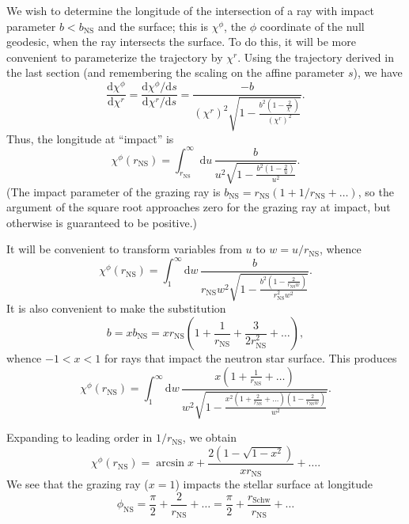 \documentclass[modern]{aastex631}
\newcommand{\dd}{\mathrm{d}}
\newcommand{\bNS}{b_\mathrm{NS}}
\newcommand{\phiNS}{\phi_\mathrm{NS}}
\newcommand{\rNS}{r_\mathrm{NS}}
\newcommand{\rSchw}{r_\mathrm{Schw}}
\begin{document}
We wish to determine the longitude of the intersection of a ray with impact
parameter $b < \bNS$ and the surface; this is $\chi^\phi$, the $\phi$ coordinate
of the null geodesic, when the ray intersects the surface.  To do this, it will
be more convenient to parameterize the trajectory by $\chi^r$. Using the
trajectory derived in the last section (and remembering the scaling on the
affine parameter $s$), we have 
\begin{equation}
\frac{\dd \chi^\phi}{\dd \chi^r} = \frac{\dd \chi^\phi/\dd s}{\dd \chi^r/\dd s} = \frac{-b}{(\chi^r)^2 \sqrt{1 - \frac{b^2 \left(1 - \frac{2}{\chi^r} \right)}{(\chi^r)^2}}}.
\end{equation}
Thus, the longitude at ``impact'' is 
\begin{equation}
\chi^\phi\left( \rNS \right) = \int_{\rNS}^{\infty} \dd u \, \frac{b}{u^2 \sqrt{1 - \frac{b^2\left(1 - \frac{2}{u} \right)}{u^2 }}}.
\end{equation}
(The impact parameter of the grazing ray is $\bNS = \rNS\left( 1 + 1/\rNS +
\ldots \right)$, so the argument of the square root approaches zero for the
grazing ray at impact, but otherwise is guaranteed to be positive.)

It will be convenient to transform variables from $u$ to $w = u/\rNS$, whence 
\begin{equation}
    \chi^\phi\left( \rNS \right) = \int_{1}^{\infty} \dd w \, \frac{b}{\rNS w^2 \sqrt{1 - \frac{b^2\left(1 - \frac{2}{\rNS w} \right)}{\rNS^2 w^2}}}.
\end{equation}
It is also convenient to make the substitution 
\begin{equation}
    b = x \bNS = x \rNS \left( 1 + \frac{1}{\rNS} + \frac{3}{2 \rNS^2} + \ldots \right),
\end{equation}
whence $-1 < x < 1$ for rays that impact the neutron star surface. This produces 
\begin{equation}
    \chi^\phi\left( \rNS \right) = \int_1^\infty \dd w \, \frac{x \left( 1 + \frac{1}{\rNS} + \ldots \right)}{w^2 \sqrt{1 - \frac{x^2 \left( 1 + \frac{2}{\rNS} + \ldots \right)\left( 1 - \frac{2}{\rNS w} \right)}{w^2}}}.
\end{equation}

Expanding to leading order in $1/\rNS$, we obtain 
\begin{equation}
    \chi^\phi\left( \rNS \right) = \arcsin x + \frac{2 \left( 1 - \sqrt{1-x^2} \right)}{x \rNS} + \ldots.
\end{equation}
We see that the grazing ray ($x = 1$) impacts the stellar surface at longitude 
\begin{equation}
    \phiNS = \frac{\pi}{2} + \frac{2}{\rNS} + \ldots = \frac{\pi}{2} + \frac{\rSchw}{\rNS} + \ldots
\end{equation}
\end{document}
